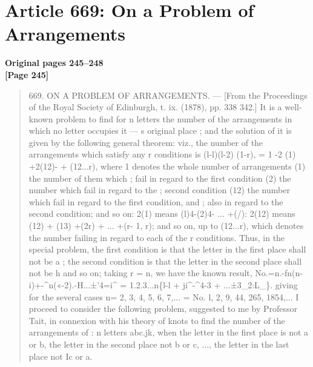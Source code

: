\documentclass[11pt,a4paper]{book}
\begin{document}
\newpage

\section*{Article 669: On a Problem of Arrangements}
\textbf{Original pages 245--248}\\[0.3cm]

\textbf{[Page 245]}\\[0.2cm]
\begin{quote}
669.
ON A PROBLEM OF ARRANGEMENTS.
---
[From the Proceedings of the Royal Society of Edinburgh, t. ix. (1878), pp. 338 342.]
It is a well-known problem to find for n letters the number of the arrangements
in which no letter occupies it --- s original place ; and the solution of it is given by
the following general theorem: viz., the number of the arrangements which satisfy
any r conditions is
(l-l)(l-2) (1-r),
= 1 -2 (1) +2(12)- + (12...r),
where 1 denotes the whole number of arrangements (1) the number of them which
;
fail in regard to the first condition (2) the number which fail in regard to the
;
second condition (12) the number which fail in regard to the first condition, and
;
also in regard to the second condition; and so on: 2(1) means (l)4-(2)4- ... +(/):
2(12) means (12) + (13) +(2r) + ... +(r- 1, r); and so on, up to (12...r), which denotes
the number failing in regard to each of the r conditions.
Thus, in the special problem, the first condition is that the letter in the first
place shall not be a ; the second condition is that the letter in the second place
shall not be h and so on; taking r = n, we have the known result,
No.=n.-fn(n-i)+-\textasciicircum{}n(«-2).-H...±'4=i\textasciicircum{}
= 1.2.3...n\{l-l + ji\textasciicircum{}-\textasciicircum{}4-3 + ...±3\_2:L\_\}.
giving for the several cases
n=
2, 3, 4, 5, 6, 7,...
=
No. l, 2, 9, 44, 265, 1854,...
I proceed to consider the following problem, suggested to me by Professor Tait,
in connexion with his theory of knots to find the number of the arrangements of
:
n letters abc.jk, when the letter in the first place is not a or b, the letter in
the second place not b or c, ..., the letter in the last place not Ic or a.
\end{quote}
\end{document}
